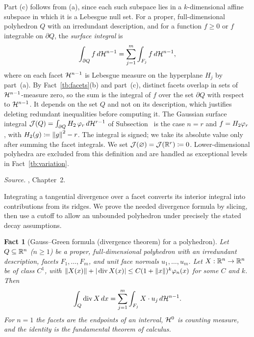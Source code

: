 \documentclass[11pt,letterpaper]{article}
\theoremstyle{plain}
\newtheorem{fact}{Fact}[section]
\begin{document}
Part (c) follows from (a), since each such subspace lies in a
\(k\)-dimensional affine subspace in which it is a Lebesgue null set. For a
proper, full-dimensional polyhedron \(Q\) with an irredundant description,
and for a function \(f\ge0\) or \(f\) integrable on \(\partial Q\), the
\emph{surface integral} is
\[
 \int_{\partial Q}f\,d\mathcal H^{n-1}=\sum_{j=1}^m\int_{F_j}f\,d\mathcal H^{n-1},
\]
where on each facet \(\mathcal H^{n-1}\) is Lebesgue measure on the hyperplane
\(H_j\) by part~(a). By Fact~\ref{tb:facets}(b) and part~(c), distinct
facets overlap in sets of \(\mathcal H^{n-1}\)-measure zero, so the sum is the
integral of \(f\) over the set \(\partial Q\) with respect to
\(\mathcal H^{n-1}\). It depends on the set \(Q\) and not on its description,
which justifies deleting redundant inequalities before computing it.
The Gaussian surface integral \(\mathcal J(Q)=\int_{\partial Q}H_2\,\varphi_r\,
d\mathcal H^{r-1}\) of Subsection~ is the case
\(n=r\) and \(f=H_2\varphi_r\), with \(H_2(g)\coloneqq \left\lVert g\right\rVert^2-r\).
The integral is signed; we take its absolute value only after summing
the facet integrals. We set \(\mathcal J(\varnothing)=\mathcal J(\mathbb R^r)\coloneqq0\).
Lower-dimensional polyhedra are excluded from this definition and are
handled as exceptional levels in Fact~\ref{tb:variation}.

\emph{Source.} , Chapter~2.

Integrating a tangential divergence over a facet converts its interior
integral into contributions from its ridges. We prove the needed divergence
formula by slicing, then use a cutoff to allow an unbounded polyhedron
under precisely the stated decay assumptions.

\begin{samepage}
\begin{fact}[Gauss--Green formula (divergence theorem) for a polyhedron]\label{tb:divergence}
Let \(Q\subseteq\mathbb R^n\) (\(n\ge1\)) be a proper, full-dimensional polyhedron
with an irredundant description, facets \(F_1,\ldots,F_m\), and unit
face normals \(u_1,\ldots,u_m\). Let \(X:\mathbb R^n\to\mathbb R^n\) be of class \(C^1\), with
\(\left\lVert X(x)\right\rVert+|\operatorname{div}X(x)|\le C(1+\left\lVert x\right\rVert)^k\varphi_n(x)\) for
some \(C\) and \(k\). Then
\[
 \int_Q\operatorname{div}X\,dx=\sum_{j=1}^m\int_{F_j}X\cdot u_j\,d\mathcal H^{n-1}.
\]
For \(n=1\) the facets are the endpoints of an interval, \(\mathcal H^0\) is
counting measure, and the identity is the fundamental theorem of calculus.
\end{fact}
\end{samepage}
\end{document}
